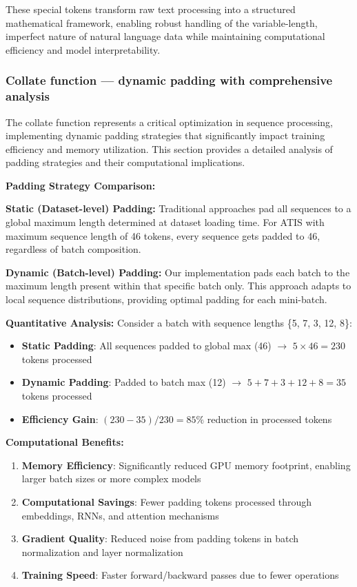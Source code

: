 \documentclass[conference]{IEEEtran}
\begin{document}
These special tokens transform raw text processing into a structured mathematical framework, enabling robust handling of the variable-length, imperfect nature of natural language data while maintaining computational efficiency and model interpretability.

\subsubsection{Collate function — dynamic padding with comprehensive analysis}

The collate function represents a critical optimization in sequence processing, implementing dynamic padding strategies that significantly impact training efficiency and memory utilization. This section provides a detailed analysis of padding strategies and their computational implications.

\textbf{Padding Strategy Comparison:}

\textbf{Static (Dataset-level) Padding:}
Traditional approaches pad all sequences to a global maximum length determined at dataset loading time. For ATIS with maximum sequence length of 46 tokens, every sequence gets padded to 46, regardless of batch composition.

\textbf{Dynamic (Batch-level) Padding:}
Our implementation pads each batch to the maximum length present within that specific batch only. This approach adapts to local sequence distributions, providing optimal padding for each mini-batch.

\textbf{Quantitative Analysis:}
Consider a batch with sequence lengths \{5, 7, 3, 12, 8\}:
\begin{itemize}
  \item \textbf{Static Padding}: All sequences padded to global max (46) $\rightarrow$ $5 \times 46 = 230$ tokens processed
  \item \textbf{Dynamic Padding}: Padded to batch max (12) $\rightarrow$ $5 + 7 + 3 + 12 + 8 = 35$ tokens processed
  \item \textbf{Efficiency Gain}: $(230 - 35) / 230 = 85\%$ reduction in processed tokens
\end{itemize}

\textbf{Computational Benefits:}
\begin{enumerate}
  \item \textbf{Memory Efficiency}: Significantly reduced GPU memory footprint, enabling larger batch sizes or more complex models
  \item \textbf{Computational Savings}: Fewer padding tokens processed through embeddings, RNNs, and attention mechanisms
  \item \textbf{Gradient Quality}: Reduced noise from padding tokens in batch normalization and layer normalization
  \item \textbf{Training Speed}: Faster forward/backward passes due to fewer operations
\end{enumerate}
\end{document}
